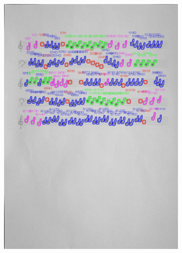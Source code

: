 \documentclass[11pt]{article}
\begin{document}
\begin{figure}[H]
    \centering
    \begin{subfigure}{.45\textwidth}
        \centering
        \graphicspath{ {blobs/} }
        \includegraphics[width=\linewidth]{4_cnts.jpg}
        \label{fig:sub1}
    \end{subfigure}%
    \begin{subfigure}{.45\textwidth}
        \centering
        \graphicspath{ {blobs/} }

\end{subfigure}
\end{figure}
\end{document}

